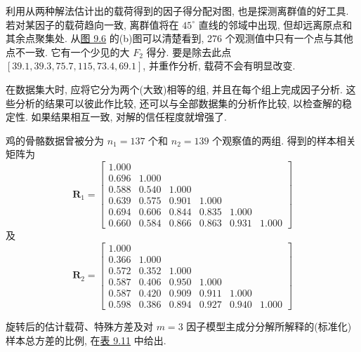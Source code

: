 
利用从两种解法估计出的载荷得到的因子得分配对图, 也是探测离群值的好工具. 若对某因子的载荷趋向一致, 离群值将在 $45^\circ$ 直线的邻域中出现, 但却远离原点和其余点聚集处. 从\hyperref[fig:9.6]{图 9.6} 的(b)图可以清楚看到, 276 个观测值中只有一个点与其他点不一致. 它有一个少见的大 $F_2$ 得分. 要是除去此点 $[39.1, 39.3, 75.7, 115, 73.4, 69.1]$, 并重作分析, 载荷不会有明显改变.

在数据集大时, 应将它分为两个(大致)相等的组, 并且在每个组上完成因子分析. 这些分析的结果可以彼此作比较, 还可以与全部数据集的分析作比较, 以检查解的稳定性. 如果结果相互一致, 对解的信任程度就增强了.

鸡的骨骼数据曾被分为 $n_1=137$ 个和 $n_2=139$ 个观察值的两组. 得到的样本相关矩阵为
\[
\mathbf{R}_1=\left[\begin{array}{rrrrrr}
1.000& & & & & \\
0.696&1.000& & & & \\
0.588&0.540&1.000& & & \\
0.639&0.575&0.901&1.000& & \\
0.694&0.606&0.844&0.835&1.000& \\
0.660&0.584&0.866&0.863&0.931&1.000
\end{array}\right]
\]
及
\[
\mathbf{R}_2=\left[\begin{array}{rrrrrr}
1.000& & & & & \\
0.366&1.000& & & & \\
0.572&0.352&1.000& & & \\
0.587&0.406&0.950&1.000& & \\
0.587&0.420&0.909&0.911&1.000& \\
0.598&0.386&0.894&0.927&0.940&1.000
\end{array}\right]
\]

旋转后的估计载荷、特殊方差及对 $m=3$ 因子模型主成分分解所解释的(标准化)样本总方差的比例, 在\hyperref[tab:9.11]{表 9.11} 中给出.

